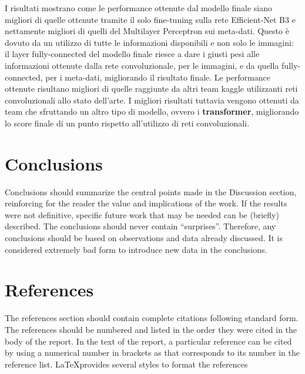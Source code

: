 I risultati mostrano come le performance ottenute dal modello finale siano migliori di quelle ottenute tramite il solo fine-tuning sulla rete Efficient-Net B3 e nettamente migliori di quelli del Multilayer Perceptron sui meta-dati. Questo è dovuto da un utilizzo di tutte le informazioni disponibili e non solo le immagini: il layer fully-connected del modello finale riesce a dare i giusti pesi alle informazioni ottenute dalla rete convoluzionale, per le immagini, e da quella fully-connected, per i meta-dati, migliorando il risultato finale. Le performance ottenute risultano migliori di quelle raggiunte da altri team kaggle utilizzanti reti convoluzionali allo stato dell'arte. I migliori risultati tuttavia vengono ottenuti da team che sfruttando un altro tipo di modello, ovvero i \textbf{transformer}, migliorando lo score finale di un punto rispetto all'utilizzo di reti convoluzionali.


\section{Conclusions}
Conclusions should summarize the central points made in the Discussion section, reinforcing for the reader the value and implications of the work. If the results were not definitive, specific future work that may be needed can be (briefly) described. The conclusions should never contain ``surprises''. Therefore, any conclusions should be based on observations and data already discussed. It is considered extremely bad form to introduce new data in the conclusions.

\section*{References}

The references section should contain complete citations following standard form.  The references should be numbered and listed in the order they were cited in the body of the report. In the text of the report, a particular reference can be cited by using a numerical number in brackets as \cite{Lee2015} that corresponds to its number in the reference list. \LaTeX provides several styles to format the references




